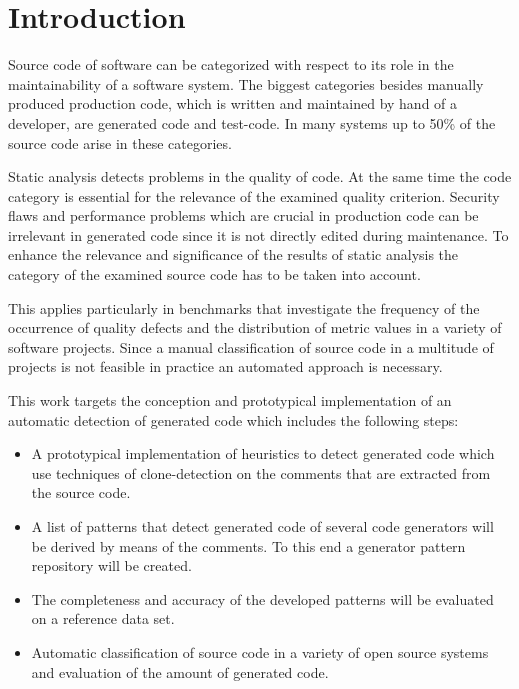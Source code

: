 
\chapter{Introduction}\label{chapter:introduction}

Source code of software can be categorized with respect to its role in the maintainability of a software system. The biggest categories besides manually produced production code, which is written and maintained by hand of a developer, are generated code and test-code. In many systems up to 50\% of the source code arise in these categories.

Static analysis detects problems in the quality of code. At the same time the code category is essential for the relevance of the examined quality criterion. Security flaws and performance problems which are crucial in production code can be irrelevant in generated code since it is not directly edited during maintenance. To enhance the relevance and significance of the results of static analysis the category of the examined source code has to be taken into account.

This applies particularly in benchmarks that investigate the frequency of the occurrence of quality defects and the distribution of metric values in a variety of software projects. Since a manual classification of source code in a multitude of projects is not feasible in practice an automated approach is necessary.

This work targets the conception and prototypical implementation of an automatic detection of generated code which includes the following steps:

\begin{itemize}
	\item A prototypical implementation of heuristics to detect generated code which use techniques of clone-detection on the comments that are extracted from the source code.
	\item A list of patterns that detect generated code of several code generators will be derived by means of the comments. To this end a generator pattern repository will be created.
	\item The completeness and accuracy of the developed patterns will be evaluated on a reference data set. 
	\item Automatic classification of source code in a variety of open source systems and evaluation of the amount of generated code. 
\end{itemize}